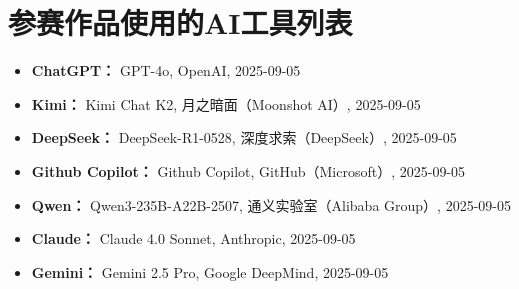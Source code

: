 \section{参赛作品使用的AI工具列表}

\begin{itemize}
    \item \textbf{ChatGPT：} GPT-4o, OpenAI, 2025-09-05
    \item \textbf{Kimi：} Kimi Chat K2, 月之暗面（Moonshot AI）, 2025-09-05
    \item \textbf{DeepSeek：}  DeepSeek-R1-0528, 深度求索（DeepSeek）, 2025-09-05
    \item \textbf{Github Copilot：} Github Copilot, GitHub（Microsoft）, 2025-09-05
    \item \textbf{Qwen：} Qwen3-235B-A22B-2507, 通义实验室（Alibaba Group）, 2025-09-05
    \item \textbf{Claude：} Claude 4.0 Sonnet, Anthropic, 2025-09-05
    \item \textbf{Gemini：} Gemini 2.5 Pro, Google DeepMind, 2025-09-05
\end{itemize}

\newenvironment{GPTblock}
{
    \begin{tcolorbox}[colback=blue!5, colframe=blue!50, title={
        \raisebox{-.2em}{\texttt{[image: icons/openai.png]}}\hspace{0.5em}\textcolor{black}{ChatGPT}
    }]
}
{
    \vspace{0.5em}
    \begin{flushright}
        \scriptsize
        \textbf{模型使用信息：} ChatGPT，GPT-4o，OpenAI，2025-09-05
    \end{flushright}
    \end{tcolorbox}
}

\newenvironment{KimiBlock}
{
    \begin{tcolorbox}[colback=purple!5, colframe=purple!50, title={
        \raisebox{-.2em}{\texttt{[image: icons/kimi-color.png]}}\hspace{0.5em}\textcolor{black}{Kimi}
    }]
}
{
    \vspace{0.5em}
    \begin{flushright}
        \scriptsize
        \textbf{模型使用信息：} Kimi，Kimi Chat K2，月之暗面（Moonshot AI），2025-09-05
    \end{flushright}
    \end{tcolorbox}
}

